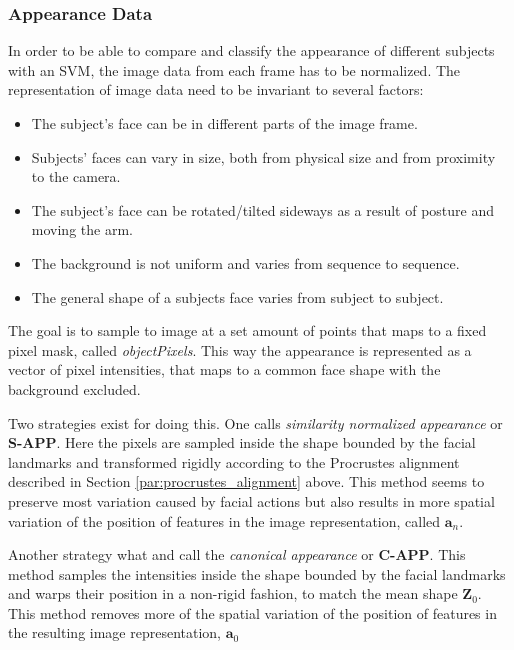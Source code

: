 \documentclass[Main]{subfiles}
\begin{document}
		\subsubsection{Appearance Data} %
			\label{ssub:appearance_data}
			In order to be able to compare and classify the appearance of different subjects with an SVM, the image data from each frame has to be normalized.
			The representation of image data need to be invariant to several factors:
			\begin{itemize}
				\item
				The subject's face can be in different parts of the image frame.

				\item
				Subjects' faces can vary in size, both from physical size and from proximity to the camera.

				\item
				The subject's face can be rotated/tilted sideways as a result of posture and moving the arm.

				\item
				The background is not uniform and varies from sequence to sequence.

				\item
				The general shape of a subjects face varies from subject to subject.

			\end{itemize}

			The goal is to sample to image at a set amount of points that maps to a fixed pixel mask, called \emph{objectPixels}.
			This way the appearance is represented as a vector of pixel intensities, that maps to a common face shape with the background excluded.
			
			Two strategies exist for doing this.
			One \cite{Ashraf2009} calls  \emph{similarity normalized appearance} or \textbf{S-APP}.
			Here the pixels are sampled inside the shape bounded by the facial landmarks and transformed rigidly according to the Procrustes alignment described in Section \ref{par:procrustes_alignment} above.
			This method seems to preserve most variation caused by facial actions but also results in more spatial variation of the position of features in the image representation, called $\textbf{a}_n$.

			Another strategy what \cite{Lucey2011} and \cite{Ashraf2009} call the \emph{canonical appearance} or \textbf{C-APP}.
			This method samples the intensities inside the shape bounded by the facial landmarks and warps their position in a non-rigid fashion, to match the mean shape $\textbf{Z}_0$.
			This method removes more of the spatial variation of the position of features in the resulting image representation, $\textbf{a}_0$
\end{document}
